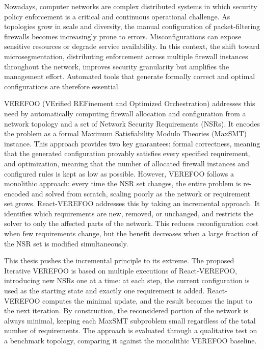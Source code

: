 Nowadays, computer networks are complex distributed systems in which security policy enforcement is a critical and continuous operational challenge. As topologies grow in scale and diversity, the manual configuration of packet-filtering firewalls becomes increasingly prone to errors. Misconfigurations can expose sensitive resources or degrade service availability. In this context, the shift toward microsegmentation, distributing enforcement across multiple firewall instances throughout the network, improves security granularity but amplifies the management effort. Automated tools that generate formally correct and optimal configurations are therefore essential.

VEREFOO (VErified REFinement and Optimized Orchestration) addresses this need by automatically computing firewall allocation and configuration from a network topology and a set of Network Security Requirements (NSRs). It encodes the problem as a formal Maximum Satisfiability Modulo Theories (MaxSMT) instance. This approach provides two key guarantees: formal correctness, meaning that the generated configuration provably satisfies every specified requirement, and optimization, meaning that the number of allocated firewall instances and configured rules is kept as low as possible. However, VEREFOO follows a monolithic approach: every time the NSR set changes, the entire problem is re-encoded and solved from scratch, scaling poorly as the network or requirement set grows. React-VEREFOO addresses this by taking an incremental approach. It identifies which requirements are new, removed, or unchanged, and restricts the solver to only the affected parts of the network. This reduces reconfiguration cost when few requirements change, but the benefit decreases when a large fraction of the NSR set is modified simultaneously.

This thesis pushes the incremental principle to its extreme. The proposed Iterative VEREFOO is based on multiple executions of React-VEREFOO, introducing new NSRs one at a time: at each step, the current configuration is used as the starting state and exactly one requirement is added. React-VEREFOO computes the minimal update, and the result becomes the input to the next iteration. By construction, the reconsidered portion of the network is always minimal, keeping each MaxSMT subproblem small regardless of the total number of requirements. The approach is evaluated through a qualitative test on a benchmark topology, comparing it against the monolithic VEREFOO baseline.
